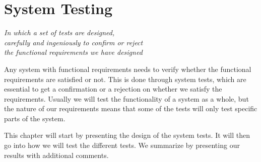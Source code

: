 \chapter{System Testing}\label{ch:sys-test}

\begin{flushright}{\slshape
    In which a set of tests are designed,\\
    carefully and ingeniously to confirm or reject\\
    the functional requirements we have designed
}
\end{flushright}

Any system with functional requirements needs to verify whether the functional
requirements are satisfied or not. This is done through system tests, which are
essential to get a confirmation or a rejection on whether we satisfy the
requirements. Usually we will test the functionality of a system as a whole, but
the nature of our requirements means that some of the tests will only test
specific parts of the system.

This chapter will start by presenting the design of the system tests. It will
then go into how we will test the different tests. We summarize by presenting
our results with additional comments.




